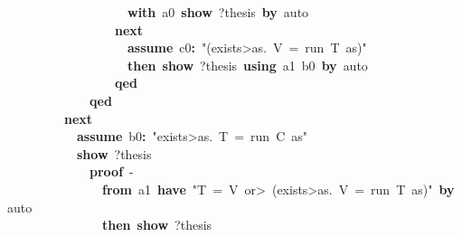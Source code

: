 \documentclass{article}
\newcommand{\syntaxKEYWORDA}[1]{\textcolor[rgb]{0.0,0.4,0.6}{\textbf{#1}}}
\newcommand{\syntaxKEYWORDC}[1]{\textcolor[rgb]{0.0,0.6,1.0}{\textbf{#1}}}
\newcommand{\syntaxLITERALA}[1]{\textcolor[rgb]{1.0,0.0,0.8}{#1}}
\newcommand{\syntaxOPERATOR}[1]{\textcolor[rgb]{0.0,0.0,0.0}{\textbf{#1}}}
\newcommand{\syntaxKEYWORDA}[1]{\textcolor[rgb]{0.0,0.4,0.6}{\textbf{#1}}}
\newcommand{\syntaxKEYWORDC}[1]{\textcolor[rgb]{0.0,0.6,1.0}{\textbf{#1}}}
\newcommand{\syntaxLITERALA}[1]{\textcolor[rgb]{1.0,0.0,0.8}{#1}}
\newcommand{\syntaxOPERATOR}[1]{\textcolor[rgb]{0.0,0.0,0.0}{\textbf{#1}}}
\newcommand{\syntaxKEYWORDA}[1]{\textcolor[rgb]{0.0,0.4,0.6}{\textbf{#1}}}
\newcommand{\syntaxKEYWORDC}[1]{\textcolor[rgb]{0.0,0.6,1.0}{\textbf{#1}}}
\newcommand{\syntaxLITERALA}[1]{\textcolor[rgb]{1.0,0.0,0.8}{#1}}
\newcommand{\syntaxOPERATOR}[1]{\textcolor[rgb]{0.0,0.0,0.0}{\textbf{#1}}}
\newcommand{\syntaxKEYWORDA}[1]{\textcolor[rgb]{0.0,0.4,0.6}{#1}}
\newcommand{\syntaxKEYWORDC}[1]{\textcolor[rgb]{0.0,0.6,1.0}{#1}}
\newcommand{\syntaxLITERALA}[1]{\textcolor[rgb]{1.0,0.0,0.8}{\textbf{#1}}}
\newcommand{\syntaxOPERATOR}[1]{\textcolor[rgb]{0.0,0.0,0.0}{#1}}
\newcommand{\syntaxKEYWORDA}[1]{\textcolor[rgb]{0.0,0.4,0.6}{\textbf{#1}}}
\newcommand{\syntaxKEYWORDC}[1]{\textcolor[rgb]{0.0,0.6,1.0}{\textbf{#1}}}
\newcommand{\syntaxLITERALA}[1]{\textcolor[rgb]{1.0,0.0,0.8}{#1}}
\newcommand{\syntaxOPERATOR}[1]{\textcolor[rgb]{0.0,0.0,0.0}{\textbf{#1}}}
\newcommand{\syntaxKEYWORDA}[1]{\textcolor[rgb]{0.0,0.4,0.6}{\textbf{#1}}}
\newcommand{\syntaxKEYWORDC}[1]{\textcolor[rgb]{0.0,0.6,1.0}{\textbf{#1}}}
\newcommand{\syntaxLITERALA}[1]{\textcolor[rgb]{1.0,0.0,0.8}{#1}}
\newcommand{\syntaxOPERATOR}[1]{\textcolor[rgb]{0.0,0.0,0.0}{\textbf{#1}}}
\begin{document}
{\ }{\ }{\ }{\ }{\ }{\ }{\ }{\ }{\ }{\ }{\ }{\ }{\ }{\ }{\ }{\ }{\ }{\ }{\ }{\ }\syntaxKEYWORDA{with}{\ }a0{\ }\syntaxKEYWORDC{show}{\ }?thesis{\ }\syntaxKEYWORDA{by}{\ }auto\hspace*{\fill}\\
{\ }{\ }{\ }{\ }{\ }{\ }{\ }{\ }{\ }{\ }{\ }{\ }{\ }{\ }{\ }{\ }{\ }{\ }\syntaxKEYWORDA{next}\hspace*{\fill}\\
{\ }{\ }{\ }{\ }{\ }{\ }{\ }{\ }{\ }{\ }{\ }{\ }{\ }{\ }{\ }{\ }{\ }{\ }{\ }{\ }\syntaxKEYWORDC{assume}{\ }c0\syntaxOPERATOR{:}{\ }\syntaxLITERALA{"(\<exists>as.{\ }V{\ }={\ }run{\ }T{\ }as)"}\hspace*{\fill}\\
{\ }{\ }{\ }{\ }{\ }{\ }{\ }{\ }{\ }{\ }{\ }{\ }{\ }{\ }{\ }{\ }{\ }{\ }{\ }{\ }\syntaxKEYWORDA{then}{\ }\syntaxKEYWORDC{show}{\ }?thesis{\ }\syntaxKEYWORDA{using}{\ }a1{\ }b0{\ }\syntaxKEYWORDA{by}{\ }auto{\ }\hspace*{\fill}\\
{\ }{\ }{\ }{\ }{\ }{\ }{\ }{\ }{\ }{\ }{\ }{\ }{\ }{\ }{\ }{\ }{\ }{\ }\syntaxKEYWORDA{qed}\hspace*{\fill}\\
{\ }{\ }{\ }{\ }{\ }{\ }{\ }{\ }{\ }{\ }{\ }{\ }{\ }{\ }\syntaxKEYWORDA{qed}\hspace*{\fill}\\
{\ }{\ }{\ }{\ }{\ }{\ }{\ }{\ }{\ }{\ }\syntaxKEYWORDA{next}\hspace*{\fill}\\
{\ }{\ }{\ }{\ }{\ }{\ }{\ }{\ }{\ }{\ }{\ }{\ }\syntaxKEYWORDC{assume}{\ }b0\syntaxOPERATOR{:}{\ }\syntaxLITERALA{"\<exists>as.{\ }T{\ }={\ }run{\ }C{\ }as"}\hspace*{\fill}\\
{\ }{\ }{\ }{\ }{\ }{\ }{\ }{\ }{\ }{\ }{\ }{\ }\syntaxKEYWORDC{show}{\ }?thesis\hspace*{\fill}\\
{\ }{\ }{\ }{\ }{\ }{\ }{\ }{\ }{\ }{\ }{\ }{\ }{\ }{\ }\syntaxKEYWORDA{proof}{\ }{-}\hspace*{\fill}\\
{\ }{\ }{\ }{\ }{\ }{\ }{\ }{\ }{\ }{\ }{\ }{\ }{\ }{\ }{\ }{\ }\syntaxKEYWORDA{from}{\ }a1{\ }\syntaxKEYWORDA{have}{\ }\syntaxLITERALA{"T{\ }={\ }V{\ }\<or>{\ }(\<exists>as.{\ }V{\ }={\ }run{\ }T{\ }as)"}{\ }\syntaxKEYWORDA{by}{\ }auto\hspace*{\fill}\\
{\ }{\ }{\ }{\ }{\ }{\ }{\ }{\ }{\ }{\ }{\ }{\ }{\ }{\ }{\ }{\ }\syntaxKEYWORDA{then}{\ }\syntaxKEYWORDC{show}{\ }?thesis\hspace*{\fill}\\
\end{document}
